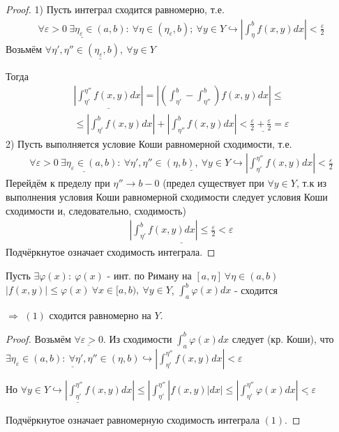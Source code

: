 \documentclass{article}
\theoremstyle{definition}
\numberwithin{theorem}{section}
\numberwithin{lemma}{section}
\numberwithin{definition}{section}
\numberwithin{corollary}{section}
\numberwithin{equation}{section}
\let\phi\varphi
\let\epsilon\varepsilon
\let\implies\Rightarrow
\let\true\hookrightarrow
\begin{document}
\begin{proof}
  \phantom{.}

  1) Пусть интеграл сходится равномерно, т.е.
  \begin{gather*}
    \underline{\forall \epsilon > 0 \ \exists \eta_{\epsilon}\in(a,b)}: \ \forall \eta \in (\eta_\epsilon,b); \ \forall y \in Y 
    \true |\int_{\eta}^{b}f(x,y)dx|<\frac{\epsilon}{2}
  \end{gather*}
  Возьмём  $\underline{\forall \eta',\eta'' \in (\eta_\epsilon,b), \ \forall y \in Y}$

  Тогда
  \begin{gather*}
    \underline{|\int_{\eta'}^{\eta''}f(x,y)dx|}=|(\int_{\eta'}^{b}-\int_{\eta''}^{b})f(x,y)dx|  \le \\
    \le |\int_{\eta'}^{b}f(x,y)dx| + |\int_{\eta''}^{b}f(x,y)dx|
    \underline{< \frac{\epsilon}{2}+\frac{\epsilon}{2}=\epsilon}
  \end{gather*}
  2) Пусть выполняется условие Коши равномерной сходимости, т.е.
  \begin{gather*}
    \underline{\forall \epsilon>0 \ \exists \eta_\epsilon \in (a,b): \ \forall \eta'},\eta'' \underline{\in (\eta,b), \ \forall y \in Y}
    \true |\int_{\eta'}^{\eta''}f(x,y)dx| < \frac{\epsilon}{2}
  \end{gather*}
  Перейдём к пределу при $\eta''\to b-0$ (предел существует при $\forall y \in Y$, т.к 
  из выполнения условия Коши равномерной сходимости следует условия Коши сходимости 
  и, следовательно, сходимость)
  \begin{gather*}
    \underline{|\int_{\eta'}^{b}f(x,y)dx|\le \frac{\epsilon}{2} < \epsilon}
  \end{gather*}
  Подчёркнутое означает сходимость интеграла.
\end{proof}
\begin{theorem}
  Пусть $\exists \phi(x): \ \phi(x)$ - инт. по Риману на $[a,\eta] \ \forall \eta \in (a,b)$
  $|f(x,y)| \le \phi(x) \ \forall x \in [a,b), \ \forall y \in Y$,
  $\int_{a}^{b}\phi(x)dx$ - сходится

  $\implies$ $(1)$ сходится равномерно на $Y$.
\end{theorem}
\begin{proof}
  Возьмём $\underline{\forall \epsilon >0}$. Из сходимости $\int_{a}^{b}\phi(x)dx$ следует (кр. Коши),
  что $\underline{\exists \eta_\epsilon \in (a,b): \ \forall \eta',\eta'' \in (\eta,b)} 
    \true |\int_{\eta'}^{\eta''}f(x,y)dx| < \epsilon$
  
    Но $\underline{\forall y \in Y \true |\int_{\eta'}^{\eta''}f(x,y)dx|} \le |\int_{\eta'}^{\eta''}|f(x,y)|dx|
    \le |\int_{\eta'}^{\eta''}\phi(x)dx|\underline{<\epsilon}$

    Подчёркнутое означает равномерную сходимость интеграла $(1)$.
\end{proof}
\end{document}
